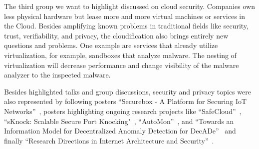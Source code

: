 The third group we want to highlight discussed on cloud security. Companies
own less physical hardware but lease  more and more virtual machines or services
in the Cloud. Besides amplifying known problems in traditional fields like
security, trust, verifiability, and privacy, the cloudification also brings
entirely new questions and problems. One example are services that already
utilize virtualization, for example, sandboxes that analyze malware. The nesting
of virtualization will decrease performance and change visibility of the malware
analyzer to the inspected malware.

Besides highlighted talks and group discussions, security and privacy topics
were also represented by following posters ``Securebox - A Platform for Securing
IoT Networks''~\cite{hafeez:s3:2015, hafeez:can:2016}, posters highlighting
ongoing research projects like ``SafeCloud''~\cite{safecloud},
``sKnock: Scalable Secure Port Knocking"~\cite{dsel:mcsp:2016},
``AutoMon''~\cite{automon}, and ``Towards an Information Model for Decentralized
Anomaly Detection for DecADe''~\cite{decade} and finally ``Research Directions
in Internet Architecture and Security''~\cite{glra, mms, ipv6hitlist}.
